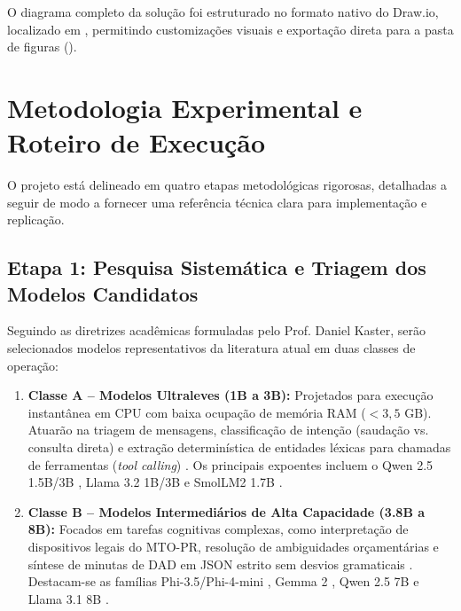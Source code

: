\documentclass[11pt]{article}
\begin{document}
O diagrama completo da solução foi estruturado no formato nativo do Draw.io, localizado em , permitindo customizações visuais e exportação direta para a pasta de figuras ().

\section{Metodologia Experimental e Roteiro de Execução}

O projeto está delineado em quatro etapas metodológicas rigorosas, detalhadas a seguir de modo a fornecer uma referência técnica clara para implementação e replicação.

\subsection{Etapa 1: Pesquisa Sistemática e Triagem dos Modelos Candidatos}
Seguindo as diretrizes acadêmicas formuladas pelo Prof. Daniel Kaster, serão selecionados modelos representativos da literatura atual em duas classes de operação:

\begin{enumerate}
    \item \textbf{Classe A -- Modelos Ultraleves (1B a 3B):} Projetados para execução instantânea em CPU com baixa ocupação de memória RAM ($< 3{,}5\text{ GB}$). Atuarão na triagem de mensagens, classificação de intenção (saudação vs. consulta direta) e extração determinística de entidades léxicas para chamadas de ferramentas (\textit{tool calling}) \citep{schick2023toolformer}. Os principais expoentes incluem o Qwen 2.5 1.5B/3B \citep{yang2024qwen25}, Llama 3.2 1B/3B \citep{dubey2024llama3} e SmolLM2 1.7B \citep{allal2024smollm2}.
    \item \textbf{Classe B -- Modelos Intermediários de Alta Capacidade (3.8B a 8B):} Focados em tarefas cognitivas complexas, como interpretação de dispositivos legais do MTO-PR, resolução de ambiguidades orçamentárias e síntese de minutas de DAD em JSON estrito sem desvios gramaticais \citep{willard2023efficient}. Destacam-se as famílias Phi-3.5/Phi-4-mini \citep{abdin2024phi3}, Gemma 2 \citep{gemmateam2024gemma2}, Qwen 2.5 7B \citep{yang2024qwen25} e Llama 3.1 8B \citep{dubey2024llama3}.
\end{enumerate}
\end{document}
